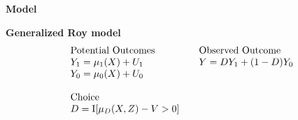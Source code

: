 \begin{frame}\begin{center}
	\LARGE\textbf{Model}
\end{center}\end{frame}
\begin{frame}
	\textbf{Generalized Roy model}
	\begin{align*}\begin{array}{l@{\qquad}l}
			\text{Potential Outcomes} &\text{Observed Outcome}\\
			Y_1 = \mu_1(X) + U_1      &  Y = D Y_1 + (1 - D)Y_0 \\
			Y_0 = \mu_0(X) + U_0      &\\
			& \\
			\text{Choice} & \\
			D = \mathrm{I}[\mu_D(X, Z) - V > 0] & \\
		\end{array}
	\end{align*}

\end{frame}

